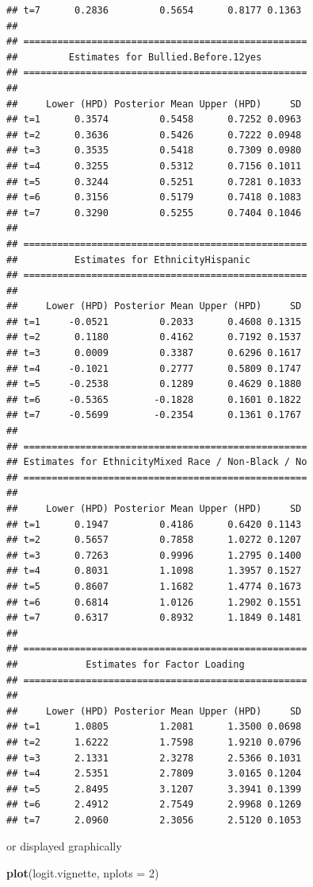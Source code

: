 \documentclass[a4paper, preprint, 3p,
authoryear]{elsarticle} %
\newenvironment{Shaded}{\begin{snugshade}}{\end{snugshade}}
\newcommand{\AttributeTok}[1]{\textcolor[rgb]{0.13,0.29,0.53}{#1}}
\newcommand{\DecValTok}[1]{\textcolor[rgb]{0.00,0.00,0.81}{#1}}
\newcommand{\FunctionTok}[1]{\textcolor[rgb]{0.13,0.29,0.53}{\textbf{#1}}}
\newcommand{\NormalTok}[1]{#1}
\begin{document}
\begin{verbatim}
## t=7      0.2836         0.5654      0.8177 0.1363
## 
## ==================================================
##         Estimates for Bullied.Before.12yes
## ==================================================
## 
##     Lower (HPD) Posterior Mean Upper (HPD)     SD
## t=1      0.3574         0.5458      0.7252 0.0963
## t=2      0.3636         0.5426      0.7222 0.0948
## t=3      0.3535         0.5418      0.7309 0.0980
## t=4      0.3255         0.5312      0.7156 0.1011
## t=5      0.3244         0.5251      0.7281 0.1033
## t=6      0.3156         0.5179      0.7418 0.1083
## t=7      0.3290         0.5255      0.7404 0.1046
## 
## ==================================================
##          Estimates for EthnicityHispanic
## ==================================================
## 
##     Lower (HPD) Posterior Mean Upper (HPD)     SD
## t=1     -0.0521         0.2033      0.4608 0.1315
## t=2      0.1180         0.4162      0.7192 0.1537
## t=3      0.0009         0.3387      0.6296 0.1617
## t=4     -0.1021         0.2777      0.5809 0.1747
## t=5     -0.2538         0.1289      0.4629 0.1880
## t=6     -0.5365        -0.1828      0.1601 0.1822
## t=7     -0.5699        -0.2354      0.1361 0.1767
## 
## ==================================================
## Estimates for EthnicityMixed Race / Non-Black / No
## ==================================================
## 
##     Lower (HPD) Posterior Mean Upper (HPD)     SD
## t=1      0.1947         0.4186      0.6420 0.1143
## t=2      0.5657         0.7858      1.0272 0.1207
## t=3      0.7263         0.9996      1.2795 0.1400
## t=4      0.8031         1.1098      1.3957 0.1527
## t=5      0.8607         1.1682      1.4774 0.1673
## t=6      0.6814         1.0126      1.2902 0.1551
## t=7      0.6317         0.8932      1.1849 0.1481
## 
## ==================================================
##            Estimates for Factor Loading
## ==================================================
## 
##     Lower (HPD) Posterior Mean Upper (HPD)     SD
## t=1      1.0805         1.2081      1.3500 0.0698
## t=2      1.6222         1.7598      1.9210 0.0796
## t=3      2.1331         2.3278      2.5366 0.1031
## t=4      2.5351         2.7809      3.0165 0.1204
## t=5      2.8495         3.1207      3.3941 0.1399
## t=6      2.4912         2.7549      2.9968 0.1269
## t=7      2.0960         2.3056      2.5120 0.1053
\end{verbatim}

or displayed graphically

\begin{Shaded}
\begin{Highlighting}[]
\FunctionTok{plot}\NormalTok{(logit.vignette, }\AttributeTok{nplots =} \DecValTok{2}\NormalTok{)}
\end{Highlighting}
\end{Shaded}
\end{document}
